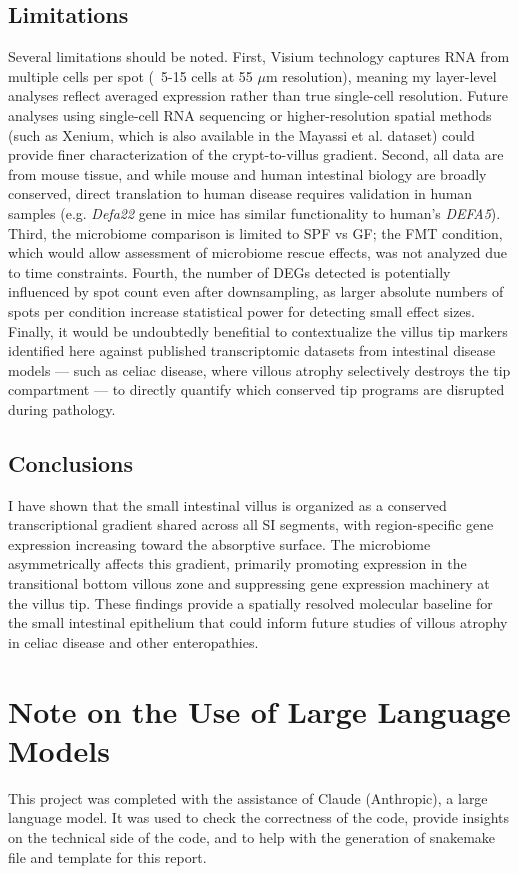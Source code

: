 \documentclass[11pt, a4paper]{article}
\begin{document}
\subsection{Limitations}

Several limitations should be noted. First, Visium technology 
captures RNA from multiple cells per spot (~5-15 cells at 
55 $\mu$m resolution), meaning my layer-level analyses reflect 
averaged expression rather than true single-cell resolution. 
Future analyses using single-cell RNA sequencing or higher-resolution 
spatial methods (such as Xenium, which is also available in the 
Mayassi et al. dataset) could provide finer characterization 
of the crypt-to-villus gradient. Second, all data are from 
mouse tissue, and while mouse and human intestinal biology 
are broadly conserved, direct translation to human disease 
requires validation in human samples (e.g. \textit{Defa22} gene 
in mice has similar functionality to human's \textit{DEFA5}). 
Third, the microbiome comparison is limited to SPF vs GF; the 
FMT condition, which would allow assessment of microbiome 
rescue effects, was not analyzed due to time constraints. 
Fourth, the number of DEGs detected is potentially influenced 
by spot count even after downsampling, as larger absolute 
numbers of spots per condition increase statistical power 
for detecting small effect sizes. Finally, it would be 
undoubtedly benefitial to contextualize the villus tip 
markers identified here against published transcriptomic 
datasets from intestinal disease models — such as celiac 
disease, where villous atrophy selectively destroys the 
tip compartment — to directly quantify which conserved 
tip programs are disrupted during pathology.

\subsection{Conclusions}

I have shown that the small intestinal villus is organized 
as a conserved transcriptional gradient shared across all SI 
segments, with region-specific gene expression increasing 
toward the absorptive surface. The microbiome asymmetrically 
affects this gradient, primarily promoting expression in the 
transitional bottom villous zone and suppressing gene 
expression machinery at the villus tip. These findings provide 
a spatially resolved molecular baseline for the small intestinal 
epithelium that could inform future studies of villous atrophy 
in celiac disease and other enteropathies.





\section*{Note on the Use of Large Language Models}

This project was completed with the assistance of Claude (Anthropic), 
a large language model. It was used to check the correctness of the code,
provide insights on the technical side of the code, and to help with the
generation of snakemake file and template for this report.
\end{document}

